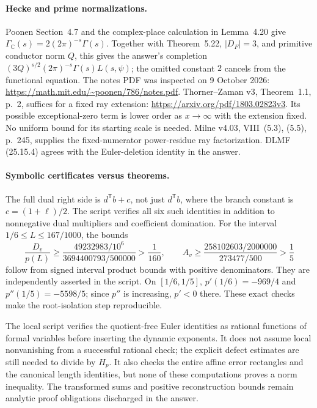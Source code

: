 \documentclass[12pt]{article}
\begin{document}
\paragraph{Hecke and prime normalizations.}
Poonen Section~4.7 and the complex-place calculation in Lemma~4.20 give
\(\Gamma_{\mathbb C}(s)=2(2\pi)^{-s}\Gamma(s)\).
Together with Theorem~5.22, \(|D_F|=3\), and primitive conductor norm
\(Q\), this gives the answer's completion
\((3Q)^{s/2}(2\pi)^{-s}\Gamma(s)L(s,\psi)\); the omitted constant \(2\)
cancels from the functional equation.
The notes PDF was inspected on 9 October 2026:
\url{https://math.mit.edu/~poonen/786/notes.pdf}.
Thorner--Zaman v3, Theorem~1.1, p.\ 2, suffices for a fixed ray extension:
\url{https://arxiv.org/pdf/1803.02823v3}.
Its possible exceptional-zero term is lower order as \(x\to\infty\)
with the extension fixed.  No uniform bound for its starting scale is
needed.  Milne v4.03, VIII~(5.3), (5.5), p.\ 245, supplies the
fixed-numerator power-residue ray factorization.
DLMF (25.15.4) agrees with the Euler-deletion identity in the answer.

\paragraph{Symbolic certificates versus theorems.}
The full dual right side is \(d^\mathsf T b+c\), not just
\(d^\mathsf T b\), where the branch constant is \(c=(1+\ell)/2\).
The script verifies all six such identities in addition to
nonnegative dual multipliers and coefficient domination.
For the interval \(1/6\le L\le167/1000\), the bounds
\[
 \frac{D_v}{p(L)}
 \ge\frac{49232983/10^6}{3694400793/500000}>\frac1{160},
 \qquad
 A_v\ge\frac{258102603/2000000}{273477/500}>\frac15
\]
follow from signed interval product bounds with positive denominators.
They are independently asserted in the script.
On \([1/6,1/5]\), \(p'(1/6)=-969/4\) and
\(p''(1/5)=-5598/5\); since \(p''\) is increasing, \(p'<0\) there.
These exact checks make the root-isolation step reproducible.

The local script verifies the quotient-free Euler identities as rational
functions of formal variables before inserting the dynamic exponents.
It does not assume local nonvanishing from a successful rational check;
the explicit defect estimates are still needed to divide by \(H_p\).
It also checks the entire affine error rectangles and the canonical
length identities, but none of these computations proves a norm inequality.
The transformed sums and positive reconstruction bounds remain analytic
proof obligations discharged in the answer.
\end{document}
